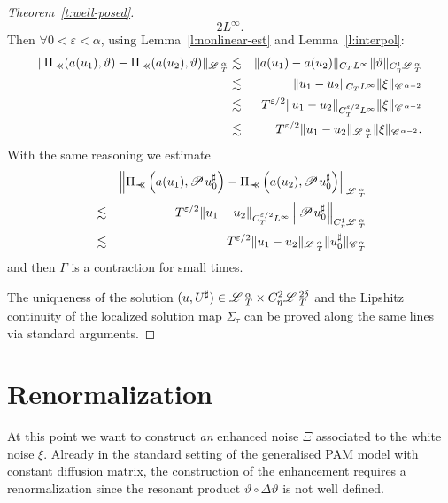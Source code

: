 \documentclass{amsart}
\newcommand{\precprec}{\prec\!\!\!\prec}
\newcommand{\tmtextit}[1]{{\itshape{#1}}}
\theoremstyle{remark}
\theoremstyle{definition}
\newcommand{\CC}{\mathscr{C} \hspace{.1em}}
\newcommand{\LL}{\mathscr{L} \hspace{.2em}}
\newcommand{\PP}{\mathscr{P} \hspace{.1em}}
\begin{document}
\begin{proof}[Theorem~\ref{t:well-posed}]
\[{{     2} L^{\infty}} . \]
  Then $\forall 0 < \varepsilon < \alpha$, using Lemma~\ref{l:nonlinear-est}
  and Lemma~\ref{l:interpol}:
  \begin{eqnarray*}
    \| \Pi_{\precprec} (a (u_1), \vartheta) - \Pi_{\precprec} (a (u_2),
    \vartheta) \|_{\LL^{\alpha}_T} & \lesssim & \| a (u_1) - a (u_2) \|_{C_T
    L^{\infty}} \| \vartheta \|_{C_{\eta}^1 \LL^{\alpha}_T}\\
    & \lesssim & \| u_1 - u_2 \|_{C_T L^{\infty}} \| \xi \|_{\CC^{\alpha -
    2}}\\
    & \lesssim & T^{\varepsilon / 2}  \| u_1 - u_2 \|_{C_T^{\varepsilon / 2}
    L^{\infty}} \| \xi \|_{\CC^{\alpha - 2}} \\
    & \lesssim & T^{\varepsilon / 2} \| u_1 - u_2 \|_{\LL^{\alpha}_T} \| \xi
    \|_{\CC^{\alpha - 2}} .
  \end{eqnarray*}
  With the same reasoning we estimate
  \begin{eqnarray*}
    &  & \left\| \Pi_{\precprec} \left( a (u_1), \PP u^{\sharp}_0 \right) -
    \Pi_{\precprec} \left( a (u_2), \PP u^{\sharp}_0 \right)
    \right\|_{\LL^{\alpha}_T}\\
    & \lesssim & T^{\varepsilon / 2} \| u_1 - u_2 \|_{C^{\varepsilon / 2}_T
    L^{\infty}} \left\| \PP u^{\sharp}_0 \right\|_{C_{\eta}^1
    \LL^{\alpha}_T}\\
    & \lesssim & T^{\varepsilon / 2} \| u_1 - u_2 \|_{\LL^{\alpha}_T} \|
    u^{\sharp}_0 \|_{\CC^{\alpha}_T}
  \end{eqnarray*}
  and then $\Gamma$ is a contraction for small times.
  
  The uniqueness of the solution $(u, U^{\sharp}) \in \LL^{\alpha}_T \times
  C_{\eta}^2 \LL^{2 \delta}_T$ and the Lipshitz continuity of the localized
  solution map $\Sigma_{\tau}$ can be proved along the same lines via standard
  arguments.
\end{proof}

\section{Renormalization\label{s:renorm}}

At this point we want to construct \tmtextit{an} enhanced noise $\Xi$
associated to the white noise $\xi$. Already in the standard setting of the
generalised PAM model with constant diffusion matrix, the construction of the
enhancement requires a renormalization since the resonant product $\vartheta
\circ \Delta \vartheta$ is not well defined.
\end{document}
